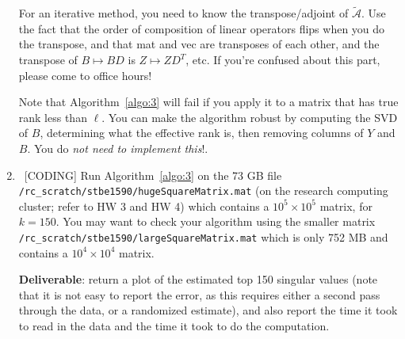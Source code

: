 \documentclass[10pt, letterpaper]{scrartcl}
\begin{document}
\begin{enumerate}[align=left, leftmargin=*, label=\sffamily\bfseries Problem \arabic*:]
    For an iterative method, you need to know the transpose/adjoint of $\widetilde{\mathcal{A}}$. Use the fact that the order of composition of linear operators flips when you do the transpose, and that mat and vec are transposes of each other, and the transpose of $B \mapsto BD$ is $ Z \mapsto ZD^T$, etc. If you're confused about this part, please come to office hours!
    
    
    Note that  Algorithm~\ref{algo:3} will fail if you apply it to a matrix that has true rank less than $\ell$. You can make the algorithm robust by computing the SVD of $B$, determining what the effective rank is, then removing columns of $Y$ and $B$. You do \emph{not need to implement this}!.
    

    
    
   \item \ [CODING] Run Algorithm~\ref{algo:3} on the 73 GB file \texttt{/rc\_scratch/stbe1590/hugeSquareMatrix.mat} (on the research computing cluster; refer to HW 3 and HW 4)   
   which contains a $10^5 \times 10^5$ matrix, for $k=150$.  You may want to check your algorithm using the smaller matrix \\
   \texttt{/rc\_scratch/stbe1590/largeSquareMatrix.mat} which is only 752 MB and contains a $10^4 \times 10^4$ matrix.
   
   \textbf{Deliverable}: return a plot of the estimated top 150 singular values (note that it is not easy to report the error, as this requires either a second pass through the data, or a randomized estimate), and also report the time it took to read in the data and the time it took to do the computation.
    
    

\end{enumerate}
\end{document}
